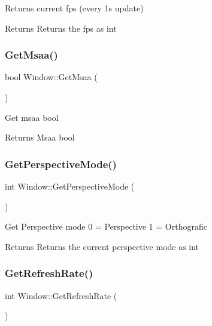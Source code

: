Returns current fps (every 1s update) \begin{DoxyReturn}{Returns}
Returns the fps as int 
\end{DoxyReturn}
\mbox{\label{class_window_a4d095b2ba52acc1ac65bed29443f3254}} 
\subsubsection{\texorpdfstring{GetMsaa()}{GetMsaa()}}
{\footnotesize\ttfamily bool Window\+::\+Get\+Msaa (\begin{DoxyParamCaption}{ }\end{DoxyParamCaption})}

Get msaa bool \begin{DoxyReturn}{Returns}
Msaa bool 
\end{DoxyReturn}
\mbox{\label{class_window_a325a7a9785e031c9025c93dbec3f21f1}} 
\subsubsection{\texorpdfstring{GetPerspectiveMode()}{GetPerspectiveMode()}}
{\footnotesize\ttfamily int Window\+::\+Get\+Perspective\+Mode (\begin{DoxyParamCaption}{ }\end{DoxyParamCaption})}

Get Perspective mode 0 = Perspective 1 = Orthografic \begin{DoxyReturn}{Returns}
Returns the current perspective mode as int 
\end{DoxyReturn}
\mbox{\label{class_window_a6e208952c08cdc852d3204c91c7f523a}} 
\subsubsection{\texorpdfstring{GetRefreshRate()}{GetRefreshRate()}}
{\footnotesize\ttfamily int Window\+::\+Get\+Refresh\+Rate (\begin{DoxyParamCaption}{ }\end{DoxyParamCaption})}

